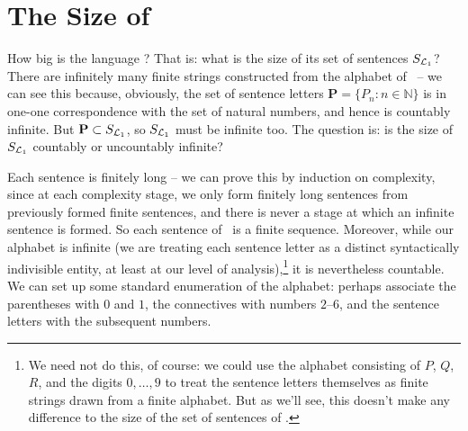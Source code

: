 \section{The Size of \texorpdfstring{\lone}{L1}}

How big is the language \lone? That is: what is the size of its set of sentences $S_{\mathcal{L}_{1}}$? There are infinitely many finite strings constructed from the alphabet of \lone\ – we can see this because, obviously, the set of sentence letters $\mathbf{P}=\{P_{n}:n \in \mathbb{N}\}$ is in one-one correspondence with the set of natural numbers, and hence is countably infinite. But $\mathbf{P}\subset S_{\mathcal{L}_{1}}$, so $S_{\mathcal{L}_{1}}$ must be infinite too. The question is: is the size of $S_{\mathcal{L}_{1}}$ countably or uncountably infinite?

Each sentence is finitely long – we can prove this by induction on complexity, since at each complexity stage, we only form finitely long sentences from previously formed finite sentences, and there is never a stage at which an infinite sentence is formed. So each sentence of \lone\ is a finite sequence. Moreover, while our alphabet is infinite (we are treating each sentence letter as a distinct syntactically indivisible entity, at least at our level of analysis),\footnote{We need not do this, of course: we could use the alphabet consisting of $P$, $Q$, $R$, and the digits $0,\ldots, 9$ to treat the sentence letters themselves as finite strings drawn from a finite alphabet. But as we'll see, this doesn't make any difference to the size of the set of sentences of \lone.} it is nevertheless countable. We can set up some standard enumeration of the alphabet: perhaps associate the parentheses with $0$ and $1$, the connectives with numbers $2$–$6$, and the sentence letters with the subsequent numbers. 

